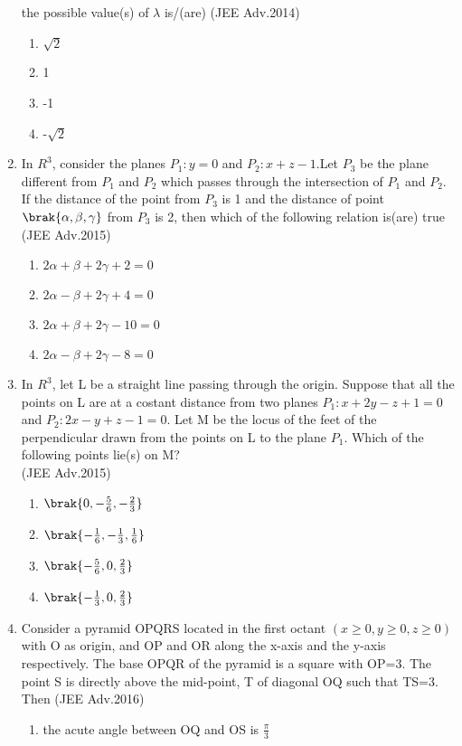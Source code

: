\begin{enumerate}
		the possible value(s) of $\lambda$ is/(are) \hfill{(JEE Adv.2014)}
		\begin{enumerate}
			\item $\sqrt{2}$
			\item 1 
			\item -1 
			\item -$\sqrt{2}$
		\end{enumerate}
	\item In $R^3$, consider the planes $P_1:y=0$ and $P_2:x+z-1$.Let $P_3$ be the plane different from $P_1$ and $P_2$ which passes through the intersection of $P_1$ and $P_2$. If the distance of the
		point from $P_3$ is 1 and the distance of point $\brak{\alpha,\beta,\gamma}$ from $P_3$ is 2,  then which of the following relation is(are) true \hfill{(JEE Adv.2015)}
		\begin{enumerate}
			\item $2\alpha+\beta+2\gamma+2=0$
			\item $2\alpha-\beta+2\gamma+4=0$
			\item $2\alpha+\beta+2\gamma-10=0$
			\item $2\alpha-\beta+2\gamma-8=0$
		\end{enumerate}
	\item In $R^3$, let L be a straight line passing through the origin. Suppose that all the points on L are at a costant distance from two planes $P_1:x+2y-z+1=0$ and $P_2:2x-y+z-1=0$. Let M be the
		locus of the feet of the perpendicular drawn from the points on L to the plane $P_1$. Which of the following points lie(s) on M? \\ \hfill{(JEE Adv.2015)}
		\begin{enumerate}
			\item $\brak{0,-\frac{5}{6},-\frac{2}{3}}$
			\item $\brak{-\frac{1}{6},-\frac{1}{3},\frac{1}{6}}$
			\item $\brak{-\frac{5}{6},0,\frac{2}{3}}$
			\item $\brak{-\frac{1}{3},0,\frac{2}{3}}$
		\end{enumerate}
	\item Consider a pyramid OPQRS located in the first octant $(x\geq 0,y\geq 0,z\geq 0)$ with O as origin, and OP and OR along the x-axis and the y-axis respectively. The base OPQR of the pyramid is
		a square with OP=3. The point S is directly above the mid-point, T of diagonal OQ such that TS=3. Then \hfill{(JEE Adv.2016)}
		\begin{enumerate}
			\item the acute angle between OQ and OS is $\frac{\pi}{3}$

\end{enumerate}
\end{enumerate}
